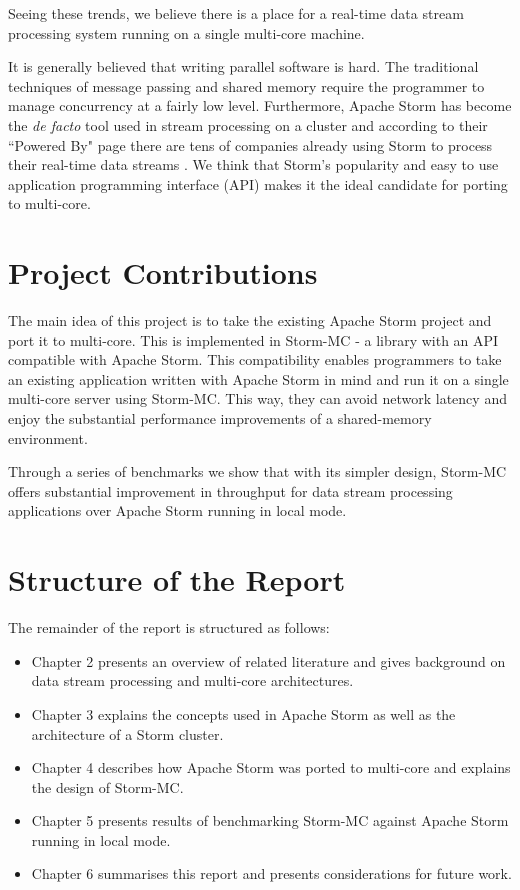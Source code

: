 \documentclass[bsc,logo,frontabs,twoside,singlespacing,normalheadings,parskip]{infthesis}\usepackage[]{graphicx}\usepackage[]{color}
\begin{document}
Seeing these trends, we believe there is a place for a real-time data stream processing system running on a single multi-core machine.

It is generally believed that writing parallel software is hard. The traditional techniques of message passing and shared memory require the programmer to manage concurrency at a fairly low level. Furthermore, Apache Storm has become the \textit{de facto} tool used in stream processing on a cluster and according to their ``Powered By" page there are tens of companies already using Storm to process their real-time data streams \cite{PoweredBy}. We think that Storm's popularity and easy to use application programming interface (API) makes it the ideal candidate for porting to multi-core.

\section{Project Contributions}

The main idea of this project is to take the existing Apache Storm project and port it to multi-core. This is implemented in Storm-MC - a library with an API compatible with Apache Storm. This compatibility enables programmers to take an existing application written with Apache Storm in mind and run it on a single multi-core server using Storm-MC. This way, they can avoid network latency and enjoy the substantial performance improvements of a shared-memory environment.

Through a series of benchmarks we show that with its simpler design, Storm-MC offers substantial improvement in throughput for data stream processing applications over Apache Storm running in local mode.

\section{Structure of the Report}

The remainder of the report is structured as follows:

\begin{itemize}
	\item Chapter 2 presents an overview of related literature and gives background on data stream processing and multi-core architectures.
	\item Chapter 3 explains the concepts used in Apache Storm as well as the architecture of a Storm cluster.
	\item Chapter 4 describes how Apache Storm was ported to multi-core and explains the design of Storm-MC.
	\item Chapter 5 presents results of benchmarking Storm-MC against Apache Storm running in local mode.
	\item Chapter 6 summarises this report and presents considerations for future work.
\end{itemize}
\clearpage{}
\end{document}
